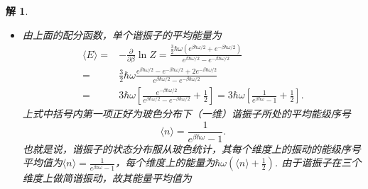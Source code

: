 \documentclass[UTF8,10pt,a4paper]{article}
\theoremstyle{Problem}
\theoremstyle{Solution}
\newtheorem*{sol}{解}
\begin{document}
\begin{sol}
\begin{enumerate}
\begin{itemize}
                        其中$\omega=\sqrt{\frac{k}{m}}$.
                        谐振子的量子配分函数为
                        \begin{align}
                            \nonumber Z= & \sum_{n_x,n_y,n_z=1}^{\infty}e^{-\beta H_{n_x,n_y,n_z}}                                                                                                                                                              \\
                            \nonumber=   & \sum_{n_x=1}^{\infty}e^{-\beta\hbar\omega\left(n_x+\frac{1}{2}\right)}\sum_{n_y=1}^{\infty}e^{-\beta\hbar\omega\left(n_y+\frac{1}{2}\right)}\sum_{n_z=1}^{\infty}e^{-\beta\hbar\omega\left(n_z+\frac{1}{2}\right)} \\
                            \nonumber=   & \left(\frac{e^{-\beta\hbar\omega/2}}{1-e^{-\beta\hbar\omega}}\right)^3=\left(\frac{1}{e^{\beta\hbar\omega/2}-e^{-\beta\hbar\omega/2}}\right)^3
                        \end{align}
                  \item[$\triangleright$] 由上面的配分函数，单个谐振子的平均能量为
                        \begin{align}
                            \nonumber\langle E\rangle= & -\frac{\partial}{\partial\beta}\ln Z=\frac{\frac{3}{2}\hbar\omega\left(e^{\beta\hbar\omega/2}+e^{-\beta\hbar\omega/2}\right)}{e^{\beta\hbar\omega/2}-e^{-\beta\hbar\omega/2}}             \\
                            \nonumber=                 & \frac{3}{2}\hbar\omega\frac{e^{\beta\hbar\omega/2}-e^{-\beta\hbar\omega/2}+2e^{-\beta\hbar\omega/2}}{e^{\beta\hbar\omega/2}-e^{-\beta\hbar\omega/2}} \\
                            =                 & 3\hbar\omega\left[\frac{e^{-\beta\hbar\omega/2}}{e^{\beta\hbar\omega/2}-e^{-\beta\hbar\omega/2}}+\frac{1}{2}\right]=3\hbar\omega\left[\frac{1}{e^{\beta\hbar\omega}-1}+\frac{1}{2}\right].
                        \end{align}
                        上式中括号内第一项正好为玻色分布下（一维）谐振子所处的平均能级序号
                        \begin{equation}
                            \langle n\rangle=\frac{1}{e^{\beta\hbar\omega}-1}.
                        \end{equation}
                        也就是说，谐振子的状态分布服从玻色统计，其每个维度上的振动的能级序号平均值为$\langle n\rangle=\frac{1}{e^{\beta\hbar\omega}-1}$，每个维度上的能量为$\hbar\omega\left(\langle n\rangle+\frac{1}{2}\right)$. 由于谐振子在三个维度上做简谐振动，故其能量平均值为

\end{itemize}
\end{enumerate}
\end{sol}
\end{document}
